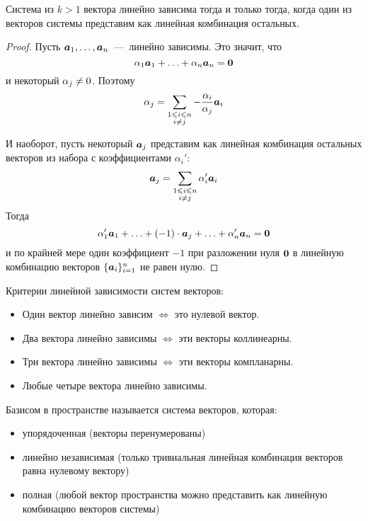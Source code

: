 \documentclass[a4paper,12pt]{article}
\begin{document}
  \begin{theorem}
    Система из $k > 1$ вектора линейно зависима тогда и только тогда, когда один из векторов системы представим как линейная комбинация остальных.
  \end{theorem}
  
  \begin{proof}
    Пусть $\boldsymbol a_1, \ldots, \boldsymbol a_n$~---~линейно зависимы.
    Это значит, что
    \[
      \alpha_1 \boldsymbol a_1 + \ldots + \alpha_n \boldsymbol a_n = \boldsymbol 0
    \]
    и некоторый $\alpha_j \hm{\not=} 0$.
    Поэтому
    \[
      \alpha_j = \sum\limits_{\substack{1 \leqslant i \leqslant n\\i \not= j}} -\frac{\alpha_i}{\alpha_j} \boldsymbol a_i
    \]
    
    И наоборот, пусть некоторый $\boldsymbol a_j$ представим как линейная комбинация остальных векторов из набора с коэффициентами $\alpha_i'$:
    \[
      \boldsymbol a_j = \sum\limits_{\substack{1 \leqslant i \leqslant n\\i \not= j}} \alpha_i' \boldsymbol a_i
    \]
    Тогда
    \[
      \alpha_1' \boldsymbol a_1 + \ldots + (-1) \cdot \boldsymbol a_j + \ldots + \alpha_n' \boldsymbol a_n = \boldsymbol 0
    \]
    и по крайней мере один коэффициент $-1$ при разложении нуля $\boldsymbol 0$ в линейную комбинацию векторов $\{\boldsymbol a_i\}_{i=1}^n$ не равен нулю.
  \end{proof}
  
  \begin{theorem}\label{theo:linear-dependence-criteria}
    Критерии линейной зависимости систем векторов:
    \begin{itemize}
      \item Один вектор линейно зависим $\Leftrightarrow$ это нулевой вектор.
      \item Два вектора линейно зависимы $\Leftrightarrow$ эти векторы коллинеарны.
      \item Три вектора линейно зависимы $\Leftrightarrow$ эти векторы компланарны.
      \item Любые четыре вектора линейно зависимы.
    \end{itemize}
  \end{theorem}
  
  \begin{definition}[Базис]
    Базисом в пространстве называется система векторов, которая:
    \begin{itemize}
      \item упорядоченная (векторы перенумерованы)
      \item линейно независимая (только тривиальная линейная комбинация векторов равна нулевому вектору)
      \item полная (любой вектор пространства можно представить как линейную комбинацию векторов системы)
    \end{itemize}
  \end{definition}
  
\end{document}
